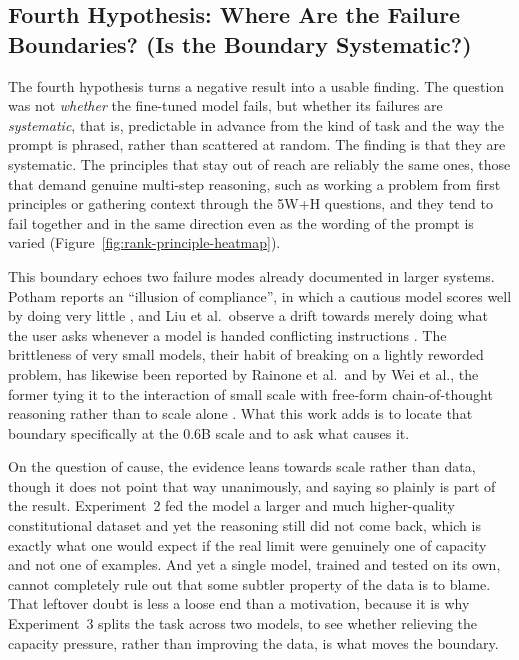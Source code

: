 \subsection{Fourth Hypothesis: Where Are the Failure Boundaries? (Is the Boundary Systematic?)}
\label{subsec:h4-failure-boundaries}

The fourth hypothesis turns a negative result into a usable finding. The question was not \emph{whether} the fine-tuned model fails, but whether its failures are \emph{systematic}, that is, predictable in advance from the kind of task and the way the prompt is phrased, rather than scattered at random. The finding is that they are systematic. The principles that stay out of reach are reliably the same ones, those that demand genuine multi-step reasoning, such as working a problem from first principles or gathering context through the 5W+H questions, and they tend to fail together and in the same direction even as the wording of the prompt is varied (Figure~\ref{fig:rank-principle-heatmap}). 

This boundary echoes two failure modes already documented in larger systems. Potham reports an ``illusion of compliance'', in which a cautious model scores well by doing very little \cite{potham2025evaluatingllmagentadherence}, and Liu et al.\ observe a drift towards merely doing what the user asks whenever a model is handed conflicting instructions \cite{liu2026generativevalueconflictsreveal}. The brittleness of very small models, their habit of breaking on a lightly reworded problem, has likewise been reported by Rainone et al.\ and by Wei et al., the former tying it to the interaction of small scale with free-form chain-of-thought reasoning rather than to scale alone \cite{rainone2025replacingthinkingtoolusage, wei2025reactplannercentricframeworkcomplex}. What this work adds is to locate that boundary specifically at the 0.6B scale and to ask what causes it.

On the question of cause, the evidence leans towards scale rather than data, though it does not point that way unanimously, and saying so plainly is part of the result. Experiment~2 fed the model a larger and much higher-quality constitutional dataset and yet the reasoning still did not come back, which is exactly what one would expect if the real limit were genuinely one of capacity and not one of examples. And yet a single model, trained and tested on its own, cannot completely rule out that some subtler property of the data is to blame. That leftover doubt is less a loose end than a motivation, because it is why Experiment~3 splits the task across two models, to see whether relieving the capacity pressure, rather than improving the data, is what moves the boundary.

